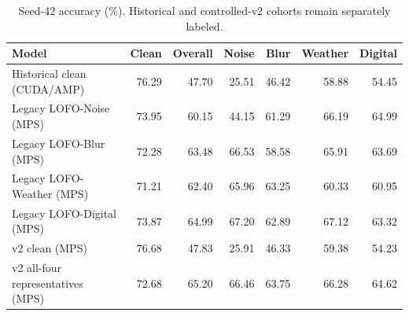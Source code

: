 \begin{table}[t]
\centering
\caption{Seed-42 accuracy (\%). Historical and controlled-v2 cohorts remain separately labeled.}
\label{tab:seed42-results}
\small
\begin{tabular}{lrrrrrr}
\toprule
Model & Clean & Overall & Noise & Blur & Weather & Digital \\
\midrule
Historical clean (CUDA/AMP) & 76.29 & 47.70 & 25.51 & 46.42 & 58.88 & 54.45 \\
Legacy LOFO-Noise (MPS) & 73.95 & 60.15 & 44.15 & 61.29 & 66.19 & 64.99 \\
Legacy LOFO-Blur (MPS) & 72.28 & 63.48 & 66.53 & 58.58 & 65.91 & 63.69 \\
Legacy LOFO-Weather (MPS) & 71.21 & 62.40 & 65.96 & 63.25 & 60.33 & 60.95 \\
Legacy LOFO-Digital (MPS) & 73.87 & 64.99 & 67.20 & 62.89 & 67.12 & 63.32 \\
v2 clean (MPS) & 76.68 & 47.83 & 25.91 & 46.33 & 59.38 & 54.23 \\
v2 all-four representatives (MPS) & 72.68 & 65.20 & 66.46 & 63.75 & 66.28 & 64.62 \\
\bottomrule
\end{tabular}
\end{table}
